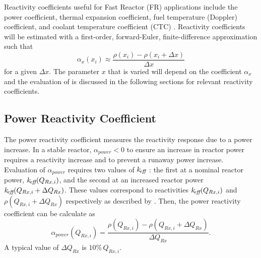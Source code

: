   Reactivity coefficients useful for Fast Reactor (FR) applications include the
  power coefficient, thermal expansion coefficient, fuel temperature (Doppler)
  coefficient, and coolant temperature coefficient (CTC) \cite{textbookknief}.
  Reactivity coefficients will be estimated with a first-order, forward-Euler,
  finite-difference approximation such that
  \begin{equation}
    \label{eq:reactivity_coefficient_finite_difference}
    \alpha_x(x_i) \approx \frac{\rho(x_i) - \rho(x_i + \Delta x)}{\Delta x}
  \end{equation}
  for a given $\Delta x$. The parameter $x$ that is varied will depend on the
  coefficient $\alpha_x$ and the evaluation of
   is discussed in the
  following sections for relevant reactivity coefficients.

  \subsection{Power Reactivity Coefficient}
  \label{sec:power_reactivity_coefficient}
    The power reactivity coefficient measures the reactivity response due to a 
    power increase. In a stable reactor, $\alpha_{power} < 0$ to ensure an 
    increase in reactor power requires a reactivity increase and to prevent a 
    runaway power increase. Evaluation of $\alpha_{power}$ requires two values 
    of $k_{\!\mbox{\scriptsize \em eff}}$ : the first at a nominal reactor power, $k_{\!\mbox{\scriptsize \em eff}}(Q_{Rx,i})$, and 
    the second at an increased reactor power 
    ${k_{\!\mbox{\scriptsize \em eff}}(Q_{Rx,i} + \Delta Q_{Rx})}$.  These \keff values correspond to 
    reactivities $k_{\!\mbox{\scriptsize \em eff}}(Q_{Rx,i})$ and ${\rho(Q_{Rx,i} + \Delta Q_{Rx})}$ 
    respectively as described by . Then, the power 
    reactivity coefficient can be calculate as
    \begin{equation}
      \label{eq:power_reactivity_coefficient}
      \alpha_{power}(Q_{Rx,i}) = \frac{\rho(Q_{Rx,i}) - \rho(Q_{Rx,i} + 
        \Delta Q_{Rx})} {\Delta Q_{Rx}}.
    \end{equation}
    A typical value of $\Delta Q_{Rx}$ is $10\% \, Q_{Rx,i}$.


